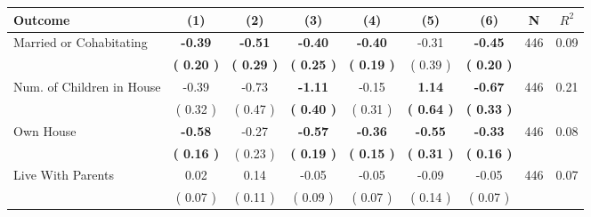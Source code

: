 \begin{tabular}{lcccccccc}
\toprule
 \textbf{Outcome} & \textbf{(1)} & \textbf{(2)} & \textbf{(3)} & \textbf{(4)} & \textbf{(5)} & \textbf{(6)} & \textbf{N} & \textbf{$ R^2$} \\
\midrule
Married or Cohabitating & \textbf{    -0.39} & \textbf{    -0.51} & \textbf{    -0.40} & \textbf{    -0.40} &     -0.31 & \textbf{    -0.45} & 446 &       0.09 \\ 
 & \textbf{(     0.20 )} & \textbf{(     0.29 )} & \textbf{(     0.25 )} & \textbf{(     0.19 )} & (     0.39 ) & \textbf{(     0.20 )} & \\
Num. of Children in House &     -0.39 &     -0.73 & \textbf{    -1.11} &     -0.15 & \textbf{     1.14} & \textbf{    -0.67} & 446 &       0.21 \\ 
 & (     0.32 ) & (     0.47 ) & \textbf{(     0.40 )} & (     0.31 ) & \textbf{(     0.64 )} & \textbf{(     0.33 )} & \\
Own House & \textbf{    -0.58} &     -0.27 & \textbf{    -0.57} & \textbf{    -0.36} & \textbf{    -0.55} & \textbf{    -0.33} & 446 &       0.08 \\ 
 & \textbf{(     0.16 )} & (     0.23 ) & \textbf{(     0.19 )} & \textbf{(     0.15 )} & \textbf{(     0.31 )} & \textbf{(     0.16 )} & \\
Live With Parents &      0.02 &      0.14 &     -0.05 &     -0.05 &     -0.09 &     -0.05 & 446 &       0.07 \\ 
 & (     0.07 ) & (     0.11 ) & (     0.09 ) & (     0.07 ) & (     0.14 ) & (     0.07 ) & \\
\bottomrule
\end{tabular}
